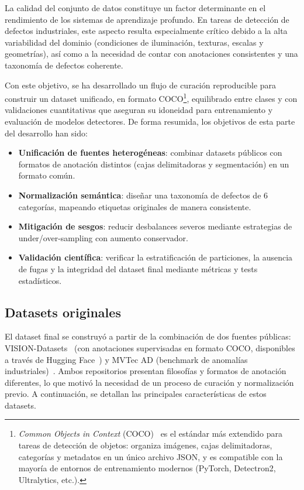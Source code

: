 La calidad del conjunto de datos constituye un factor determinante en el rendimiento de los sistemas de aprendizaje profundo. En tareas de detección de defectos industriales, este aspecto resulta especialmente crítico debido a la alta variabilidad del dominio (condiciones de iluminación, texturas, escalas y geometrías), así como a la necesidad de contar con anotaciones consistentes y una taxonomía de defectos coherente.

Con este objetivo, se ha desarrollado un flujo de curación reproducible para construir un dataset unificado, en formato COCO\footnote{\textit{Common Objects in Context} (COCO)~\cite{lin2014coco} es el estándar más extendido para tareas de detección de objetos: organiza imágenes, cajas delimitadoras, categorías y metadatos en un único archivo JSON, y es compatible con la mayoría de entornos de entrenamiento modernos (PyTorch, Detectron2, Ultralytics, etc.).}, equilibrado entre clases y con validaciones cuantitativas que aseguran su idoneidad para entrenamiento y evaluación de modelos detectores. De forma resumida, los objetivos de esta parte del desarrollo han sido:

\begin{itemize}
    \item \textbf{Unificación de fuentes heterogéneas}: combinar datasets públicos con formatos de anotación distintos (cajas delimitadoras y segmentación) en un formato común.
    \item \textbf{Normalización semántica}: diseñar una taxonomía de defectos de 6 categorías, mapeando etiquetas originales de manera consistente.
    \item \textbf{Mitigación de sesgos}: reducir desbalances severos mediante estrategias de under/over-sampling con aumento conservador.
    \item \textbf{Validación científica}: verificar la estratificación de particiones, la ausencia de fugas y la integridad del dataset final mediante métricas y tests estadísticos.
\end{itemize}

\subsection{Datasets originales}

El dataset final se construyó a partir de la combinación de dos fuentes públicas: VISION-Datasets~\cite{bai2023visiondatasets} (con anotaciones supervisadas en formato COCO, disponibles a través de Hugging Face~\cite{visiondatasets_huggingface}) y MVTec AD (benchmark de anomalías industriales)~\cite{bergmann2019mvtec}. Ambos repositorios presentan filosofías y formatos de anotación diferentes, lo que motivó la necesidad de un proceso de curación y normalización previo. A continuación, se detallan las principales características de estos datasets.


